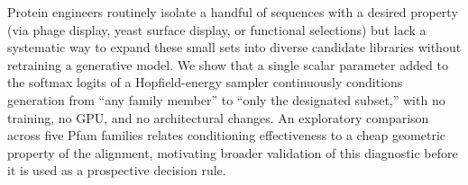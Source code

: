
Protein engineers routinely isolate a handful of sequences with a desired property (via phage
display, yeast surface display, or functional selections) but lack a systematic way to expand
these small sets
into diverse candidate libraries without retraining a generative model. We show that a single
scalar parameter added to the softmax logits of a Hopfield-energy sampler continuously conditions
generation from ``any family member'' to ``only the designated subset,'' with no training, no GPU, and no
architectural changes. An exploratory comparison across five Pfam families relates conditioning
effectiveness to a cheap geometric property of the alignment, motivating broader validation of
this diagnostic before it is used as a prospective decision rule.

